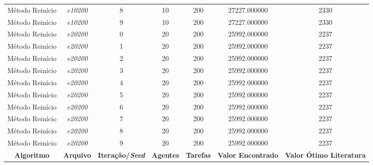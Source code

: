 {\begin{longtable}{cc|c|cc|cc}
			Método Reinício    & \textit{e10200}    & 8                               & 10               & 200              & 27227.000000                          & 2330 \\ 
			Método Reinício    & \textit{e10200}    & 9                               & 10               & 200              & 27227.000000                          & 2330 \\ \hline
			Método Reinício    & \textit{e20200}    & 0                               & 20               & 200              & 25992.000000                          & 2237 \\ 
			Método Reinício    & \textit{e20200}    & 1                               & 20               & 200              & 25992.000000                          & 2237 \\ 
			Método Reinício    & \textit{e20200}    & 2                               & 20               & 200              & 25992.000000                          & 2237 \\ 
			Método Reinício    & \textit{e20200}    & 3                               & 20               & 200              & 25992.000000                          & 2237 \\ 
			Método Reinício    & \textit{e20200}    & 4                               & 20               & 200              & 25992.000000                          & 2237 \\ 
			Método Reinício    & \textit{e20200}    & 5                               & 20               & 200              & 25992.000000                          & 2237 \\ 
			Método Reinício    & \textit{e20200}    & 6                               & 20               & 200              & 25992.000000                          & 2237 \\ 
			Método Reinício    & \textit{e20200}    & 7                               & 20               & 200              & 25992.000000                          & 2237 \\ 
			Método Reinício    & \textit{e20200}    & 8                               & 20               & 200              & 25992.000000                          & 2237 \\ 
			Método Reinício    & \textit{e20200}    & 9                               & 20               & 200              & 25992.000000                          & 2237 \\ \hline
			\hline \hline
			\textbf{Algoritmo} & \textbf{Arquivo}   & \textbf{Iteração/\textit{Seed}} & \textbf{Agentes} & \textbf{Tarefas} & \textbf{Valor Encontrado} & \textbf{Valor Ótimo Literatura} \\ \hline

\end{longtable}}
